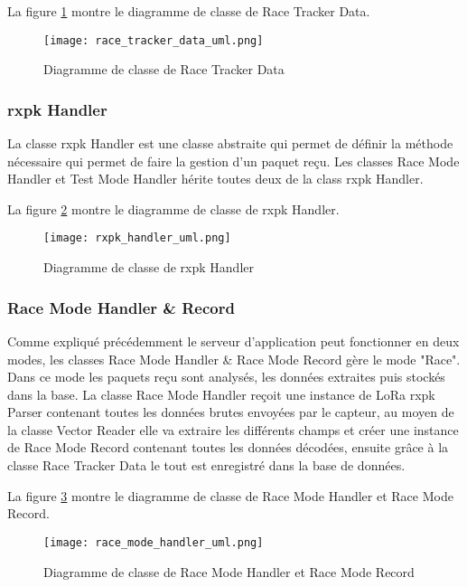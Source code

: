 La figure \ref{fig:race_tracker_data_uml} montre le diagramme de classe de Race Tracker Data.

\begin{figure}[htb]
\centering 
\texttt{[image: race\_tracker\_data\_uml.png]} 
\caption{Diagramme de classe de Race Tracker Data}
\label{fig:race_tracker_data_uml}
\end{figure}

\subsubsection{rxpk Handler}

La classe rxpk Handler est une classe abstraite qui permet de définir la méthode nécessaire qui permet de faire la gestion d'un paquet reçu. Les classes Race Mode Handler et Test Mode Handler hérite toutes deux de la class rxpk Handler.

La figure \ref{fig:rxpk_handler_uml} montre le diagramme de classe de rxpk Handler.

\begin{figure}[htb]
\centering 
\texttt{[image: rxpk\_handler\_uml.png]} 
\caption{Diagramme de classe de rxpk Handler}
\label{fig:rxpk_handler_uml}
\end{figure}

\subsubsection{Race Mode Handler \& Record}

Comme expliqué précédemment le serveur d'application peut fonctionner en deux modes, les classes Race Mode Handler \& Race Mode Record gère le mode "Race". Dans ce mode les paquets reçu sont analysés, les données extraites puis  stockés dans la base. La classe Race Mode Handler reçoit une instance de LoRa rxpk Parser contenant toutes les données brutes envoyées par le capteur, au moyen de la classe Vector Reader elle va extraire les différents champs et créer une instance de Race Mode Record contenant toutes les données décodées, ensuite grâce à la classe Race Tracker Data le tout est enregistré dans la base de données.

La figure \ref{fig:race_mode_handler_uml} montre le diagramme de classe de Race Mode Handler et Race Mode Record.

\begin{figure}[htb]
\centering 
\texttt{[image: race\_mode\_handler\_uml.png]} 
\caption{Diagramme de classe de Race Mode Handler et Race Mode Record}
\label{fig:race_mode_handler_uml}
 \end{figure}

